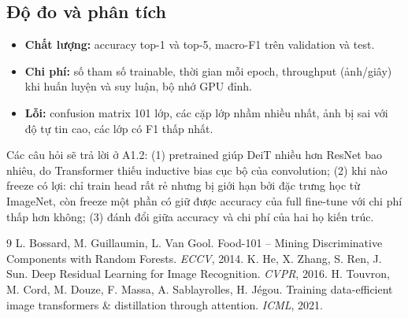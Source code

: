 \documentclass[11pt,a4paper]{article}
\begin{document}
\subsection{Độ đo và phân tích}
\begin{itemize}
\item \textbf{Chất lượng:} accuracy top-1 và top-5, macro-F1 trên validation và test.
\item \textbf{Chi phí:} số tham số trainable, thời gian mỗi epoch, throughput (ảnh/giây) khi huấn luyện và suy luận, bộ nhớ GPU đỉnh.
\item \textbf{Lỗi:} confusion matrix 101 lớp, các cặp lớp nhầm nhiều nhất, ảnh bị sai với độ tự tin cao, các lớp có F1 thấp nhất.
\end{itemize}
Các câu hỏi sẽ trả lời ở A1.2: (1) pretrained giúp DeiT nhiều hơn ResNet bao nhiêu, do Transformer thiếu inductive bias cục bộ của convolution; (2) khi nào freeze có lợi: chỉ train head rất rẻ nhưng bị giới hạn bởi đặc trưng học từ ImageNet, còn freeze một phần có giữ được accuracy của full fine-tune với chi phí thấp hơn không; (3) đánh đổi giữa accuracy và chi phí của hai họ kiến trúc.

\begin{thebibliography}{9}
 L. Bossard, M. Guillaumin, L. Van Gool. Food-101 -- Mining Discriminative Components with Random Forests. \emph{ECCV}, 2014.
 K. He, X. Zhang, S. Ren, J. Sun. Deep Residual Learning for Image Recognition. \emph{CVPR}, 2016.
 H. Touvron, M. Cord, M. Douze, F. Massa, A. Sablayrolles, H. Jégou. Training data-efficient image transformers \& distillation through attention. \emph{ICML}, 2021.
\end{thebibliography}
\end{document}
